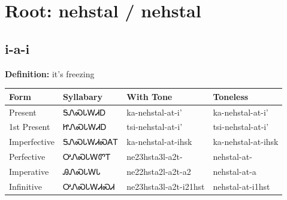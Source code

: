 \documentclass{article}%
\begin{document}
%
\normalsize%
\section*{Root: nehstal / nehstal}%
\subsection*{i-a-i}%
\textbf{Definition: }%
it’s freezing%
\\[0.5em]%
\begin{tabular}{|l|l|l|l|}%
\hline%
\textbf{Form}&\textbf{Syllabary}&\textbf{With Tone}&\textbf{Toneless}\\%
\hline%
Present&ᎦᏁᏍᏓᎳᏗᎠ&ka{-}nehstal{-}at{-}i'&ka{-}nehstal{-}at{-}i'\\%
1st Present&ᏥᏁᏍᏓᎳᏗᎠ&tsi{-}nehstal{-}at{-}i'&tsi{-}nehstal{-}at{-}i'\\%
Imperfective&ᎦᏁᏍᏓᎳᏗᏍᎪᎢ&ka{-}nehstal{-}at{-}ihsk&ka{-}nehstal{-}at{-}ihsk\\%
Perfective&ᎤᏁᏍᏓᎳᏛᎢ&ne23hsta3l{-}a2t{-}&nehstal{-}at{-}\\%
Imperative&ᎯᏁᏍᏓᎳᏓ&ne22hsta2l{-}a2t{-}a2&nehstal{-}at{-}a\\%
Infinitive&ᎤᏁᏍᏓᎳᏗᏍᏗ&ne23hsta3l{-}a2t{-}i21hst&nehstal{-}at{-}i1hst\\%
\hline%
\end{tabular}%
\\[1em]%
\end{document}
